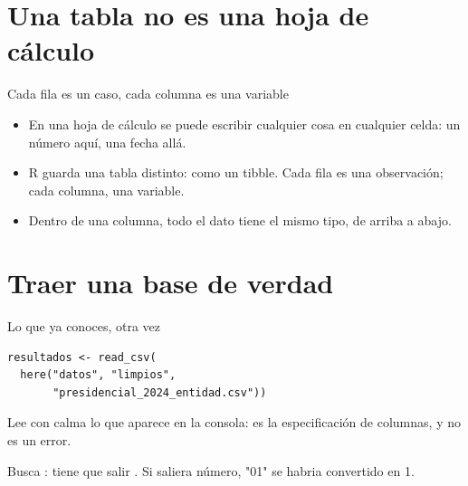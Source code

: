 \section{Una tabla no es una hoja de cálculo}

\begin{frame}{Cada fila es un caso, cada columna es una variable}
  \vspace{0.3em}
  \begin{itemize}\setlength{\itemsep}{0.9em}
    \item<1-> En una hoja de cálculo se puede escribir cualquier cosa en
          cualquier celda: un número aquí, una fecha allá.
    \item<2-> R guarda una tabla distinto: como un \ac{tibble}. Cada fila es
          una observación; cada columna, una variable.
    \item<3-> Dentro de una columna, todo el dato tiene el mismo tipo, de
          arriba a abajo.
  \end{itemize}

  \vspace{1.1em}
\end{frame}

\section{Traer una base de verdad}

\begin{frame}[fragile]{Lo que ya conoces, otra vez}
\begin{lstlisting}
resultados <- read_csv(
  here("datos", "limpios",
       "presidencial_2024_entidad.csv"))
\end{lstlisting}

  \vspace{0.6em}
  Lee con calma lo que aparece en la consola: es la
  \ac{especificación de columnas}, y no es un error.

  \vspace{0.5em}
  {\small\color{grisTenue}Busca : tiene que salir
  . Si saliera número, "01" se habria convertido en 1.}
\end{frame}

